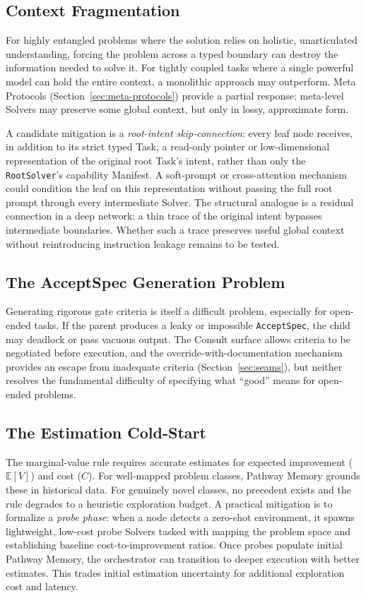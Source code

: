 \documentclass[11pt]{article}
\let\oldtexttt\texttt
\renewcommand{\texttt}[1]{\oldtexttt{\small #1}}
\begin{document}
\subsection{Context Fragmentation}

For highly entangled problems where the solution relies on holistic, unarticulated understanding, forcing the problem across a typed boundary can destroy the information needed to solve it. For tightly coupled tasks where a single powerful model can hold the entire context, a monolithic approach may outperform. Meta Protocols (Section~\ref{sec:meta-protocols}) provide a partial response: meta-level Solvers may preserve some global context, but only in lossy, approximate form.

A candidate mitigation is a \emph{root-intent skip-connection}: every leaf node receives, in addition to its strict typed Task, a read-only pointer or low-dimensional representation of the original root Task's intent, rather than only the \texttt{RootSolver}'s capability Manifest. A soft-prompt or cross-attention mechanism could condition the leaf on this representation without passing the full root prompt through every intermediate Solver. The structural analogue is a residual connection in a deep network: a thin trace of the original intent bypasses intermediate boundaries. Whether such a trace preserves useful global context without reintroducing instruction leakage remains to be tested.

\subsection{The AcceptSpec Generation Problem}

Generating rigorous gate criteria is itself a difficult problem, especially for open-ended tasks. If the parent produces a leaky or impossible \texttt{AcceptSpec}, the child may deadlock or pass vacuous output. The Consult surface allows criteria to be negotiated before execution, and the override-with-documentation mechanism provides an escape from inadequate criteria (Section~\ref{sec:seams}), but neither resolves the fundamental difficulty of specifying what ``good'' means for open-ended problems.

\subsection{The Estimation Cold-Start}
\label{sec:cold-start}

The marginal-value rule requires accurate estimates for expected improvement ($\mathbb{E}[V]$) and cost ($C$). For well-mapped problem classes, Pathway Memory grounds these in historical data. For genuinely novel classes, no precedent exists and the rule degrades to a heuristic exploration budget. A practical mitigation is to formalize a \emph{probe phase}: when a node detects a zero-shot environment, it spawns lightweight, low-cost probe Solvers tasked with mapping the problem space and establishing baseline cost-to-improvement ratios. Once probes populate initial Pathway Memory, the orchestrator can transition to deeper execution with better estimates. This trades initial estimation uncertainty for additional exploration cost and latency.
\end{document}
